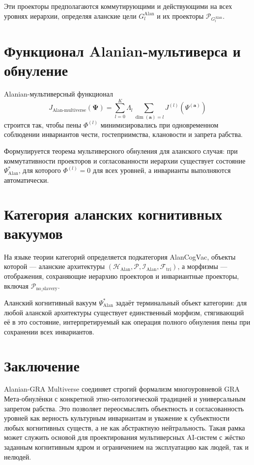 \documentclass[11pt,a4paper]{article}
\begin{document}
Эти проекторы предполагаются коммутирующими и действующими на всех уровнях
иерархии, определяя аланские цели \(G_l^{\text{Alan}}\) и их проекторы
\(\mathcal{P}_{G_l^{\text{Alan}}}\).

\section{Функционал Alanian-мультиверса и обнуление}

Alanian-мультиверсный функционал
\[
J_{\text{Alan-multiverse}}(\mathbf{\Psi}) =
\sum_{l=0}^{K} \Lambda_l
\sum_{\dim(\mathbf{a})=l} J^{(l)}(\Psi^{(\mathbf{a})})
\]
строится так, чтобы пены \(\Phi^{(l)}\) минимизировались при одновременном
соблюдении инвариантов чести, гостеприимства, клановости и запрета рабства.

Формулируется теорема мультиверсного обнуления для аланского случая:
при коммутативности проекторов и согласованности иерархии существует
состояние \(\Psi^*_{\text{Alan}}\), для которого \(\Phi^{(l)} = 0\) для всех
уровней, а инварианты выполняются автоматически.

\section{Категория аланских когнитивных вакуумов}

На языке теории категорий определяется подкатегория AlanCogVac, объекты которой
— аланские архитектуры \((\mathcal{H}_{\text{Alan}}, \mathcal{P}, \mathcal{I}_{\text{Alan}},
\mathcal{F}_{\text{tri}})\), а морфизмы — отображения, сохраняющие иерархию
проекторов и инвариантные проекторы, включая \(\mathcal{P}_{\text{no\_slavery}}\).

Аланский когнитивный вакуум \(\Psi^*_{\text{Alan}}\) задаёт терминальный
объект категории: для любой аланской архитектуры существует единственный
морфизм, стягивающий её в это состояние, интерпретируемый как операция
полного обнуления пены при сохранении всех инвариантов.

\section{Заключение}

Alanian-GRA Multiverse соединяет строгий формализм многоуровневой GRA
Мета-обнулёнки с конкретной этно-онтологической традицией и универсальным
запретом рабства. Это позволяет переосмыслить объектность и согласованность
уровней как верность культурным инвариантам и уважение к субъектности
любых когнитивных существ, а не как абстрактную нейтральность. Такая рамка
может служить основой для проектирования мультиверсных AI-систем с жёстко
заданным когнитивным ядром и ограничением на эксплуатацию как людей, так
и нелюдей.
\end{document}
